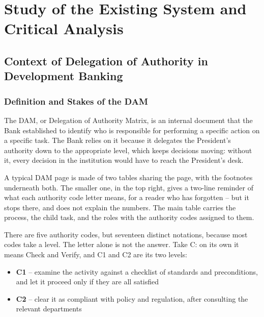 \section{Study of the Existing System and Critical Analysis}


\subsection{Context of Delegation of Authority in Development Banking}


\subsubsection{Definition and Stakes of the DAM}

The DAM, or Delegation of Authority Matrix, is an internal document that
the Bank established to identify who is responsible for performing a
specific action on a specific task. The Bank relies on it because it
delegates the President's authority down to the appropriate level, which
keeps decisions moving: without it, every decision in the institution
would have to reach the President's desk.

A typical DAM page is made of two tables sharing the page, with the
footnotes underneath both. The smaller one, in the top right, gives a
two-line reminder of what each authority code letter means, for a reader
who has forgotten -- but it stops there, and does not explain the
numbers. The main table carries the process, the child task, and the
roles with the authority codes assigned to them.

There are five authority codes, but seventeen distinct notations, because
most codes take a level. The letter alone is not the answer. Take C: on
its own it means Check and Verify, and C1 and C2 are its two levels:

\begin{itemize}
\item \textbf{C1} -- examine the activity against a checklist of
  standards and preconditions, and let it proceed only if they are all
  satisfied
\item \textbf{C2} -- clear it as compliant with policy and regulation,
  after consulting the relevant departments
\end{itemize}

